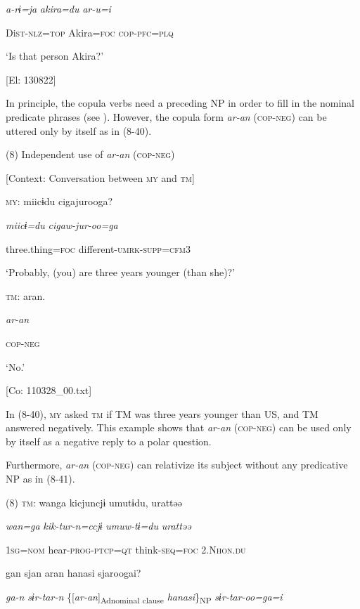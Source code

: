       \textit{a-rɨ=ja}  \textit{akira=du}  \textit{ar-u=i}

      Di\textsc{st}-\textsc{nlz}=\textsc{top}  Akira=\textsc{foc}  \textsc{cop}-\textsc{pfc}=\textsc{plq}

      ‘Is that person Akira?’

      [El: 130822]

  In principle, the copula verbs need a preceding NP in order to fill in the nominal predicate phrases (see ). However, the copula form \textit{ar-an} (\textsc{cop}-\textsc{neg}) can be uttered only by itself as in (8-40).

(8)  Independent use of \textit{ar-an} (\textsc{cop}-\textsc{neg})

  [Context: Conversation between \textsc{my} and \textsc{tm}]

  \textsc{my}:  miicɨdu  cigajurooga?

    \textit{miicɨ=du}  \textit{cigaw-jur-oo=ga}

    three.thing=\textsc{foc}  different-\textsc{umrk}-\textsc{supp}=\textsc{cfm}3

    ‘Probably, (you) are three years younger (than she)?’

  \textsc{tm}:  aran.

    \textit{ar-an}

    \textsc{cop}-\textsc{neg}

    ‘No.’

    [Co: 110328\_00.txt]

In (8-40), \textsc{my} asked \textsc{tm} if TM was three years younger than US, and TM answered negatively. This example shows that \textit{ar-an} (\textsc{cop}-\textsc{neg}) can be used only by itself as a negative reply to a polar question.

  Furthermore, \textit{ar-an} (\textsc{cop}-\textsc{neg}) can relativize its subject without any predicative NP as in (8-41).

(8)  \textsc{tm}:  wanga  kicjuncjɨ  umutɨdu,  urattəə

    \textit{wan=ga}  \textit{kik-tur-n=ccjɨ}  \textit{umuw-tɨ=du}  \textit{urattəə}

    1\textsc{sg}=\textsc{nom}  hear-\textsc{prog}-\textsc{ptcp}=\textsc{qt}  think-\textsc{seq}=\textsc{foc}  2.N\textsc{hon}.\textsc{du}

    gan  sjan  aran  hanasi  sjaroogai?

    \textit{ga-n}  \textit{sɨr-tar-n}  \{[\textit{ar-an}]\textsubscript{Adnominal clause}  \textit{hanasi}\}\textsubscript{NP}  \textit{sɨr-tar-oo=ga=i}

